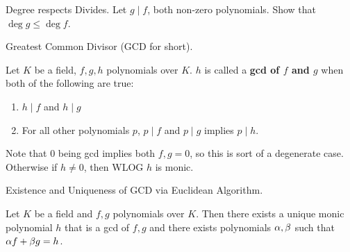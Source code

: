 \documentclass[../../book.tex]{subfiles}
\begin{document}
\begin{ex} Degree respects Divides.
    Let $g \mid f$, both non-zero polynomials. Show that $\deg g \leq \deg f$. 
\end{ex}
\begin{dfn} Greatest Common Divisor (GCD for short). 

    Let $K$ be a field, $f, g, h$ polynomials over $K$. 
    $h$ is called a \textbf{gcd of $f$ and $g$} when both of the following are true:
    \begin{enumerate}
        \item $h \mid f$ and $h \mid g$
        \item For all other polynomials $p$, 
        $p \mid f$ and $p \mid g$ implies $p \mid h$.
    \end{enumerate}
    Note that $0$ being gcd implies both $f, g = 0$,
    so this is sort of a degenerate case. 
    Otherwise if $h \neq 0$, then WLOG $h$ is monic.
\end{dfn}
\begin{thm} Existence and Uniqueness of GCD via Euclidean Algorithm. 

    Let $K$ be a field and $f, g$ polynomials over $K$. 
    Then there exists a unique monic polynomial $h$ that is a gcd of $f, g$ 
    and there exists polynomials $\alpha, \beta$ such that $\alpha f + \beta g = h$.
    
\end{thm}
\end{document}

